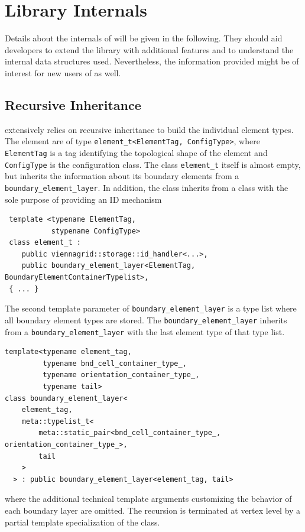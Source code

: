 \chapter{Library Internals} \label{chap:internals}

Details about the internals of {\ViennaGrid} will be given in the following.
They should aid developers to extend the library with additional features
and to understand the internal data structures used.
Nevertheless, the information provided might be of interest for new users of {\ViennaGrid} as well.

\section{Recursive Inheritance}
{\ViennaGrid} extensively relies on recursive inheritance to build the individual element types.
The element are of type \lstinline|element_t<ElementTag, ConfigType>|, where \lstinline|ElementTag| is a tag identifying the topological shape of the element and \lstinline|ConfigType| is the configuration class. The class \lstinline|element_t| itself is almost empty, but
inherits the information about its boundary elements from a \lstinline|boundary_element_layer|.
In addition, the class inherits from a class with the sole purpose of providing an ID mechanism
\begin{lstlisting}
 template <typename ElementTag,
           stypename ConfigType>
 class element_t :
    public viennagrid::storage::id_handler<...>,
    public boundary_element_layer<ElementTag, BoundaryElementContainerTypelist>,
 { ... }
\end{lstlisting}
The second template parameter of \lstinline|boundary_element_layer| is a type list where all boundary element types are stored. The \lstinline|boundary_element_layer| inherits from a \lstinline|boundary_element_layer| with the last element type of that type list.
\begin{lstlisting}
template<typename element_tag,
         typename bnd_cell_container_type_,
         typename orientation_container_type_,
         typename tail>
class boundary_element_layer<
    element_tag,
    meta::typelist_t<
        meta::static_pair<bnd_cell_container_type_, orientation_container_type_>,
        tail
    >
  > : public boundary_element_layer<element_tag, tail>
\end{lstlisting}
where the additional technical template arguments customizing the behavior of each boundary layer are omitted.
The recursion is terminated at vertex level by a partial template specialization of the class.


